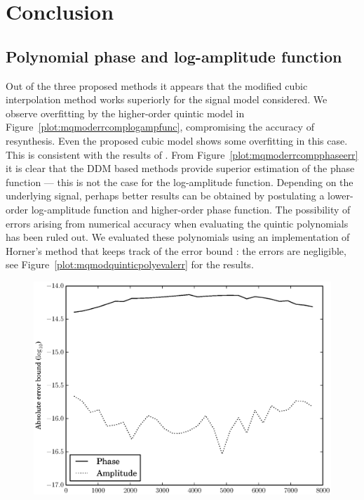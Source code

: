 \section{Conclusion}

\subsection{Polynomial phase and log-amplitude function}

Out of the three proposed methods it appears that the modified cubic
interpolation method works superiorly for the signal model considered. We observe
overfitting by the higher-order quintic model in
Figure~\ref{plot:mqmoderrcomplogampfunc}, compromising the accuracy of
resynthesis.  Even the proposed cubic model shows some overfitting in this case.
This is consistent with the results of \cite{girin2003comparing}. From
Figure~\ref{plot:mqmoderrcompphaseerr} it is clear that the DDM based methods
provide superior estimation of the phase function --- this is not the case for
the log-amplitude function. Depending on the underlying signal, perhaps better
results can be obtained by postulating a lower-order log-amplitude function and
higher-order phase function. The possibility of errors arising from numerical
accuracy when evaluating the quintic polynomials has been ruled out.  We
evaluated these polynomials using an implementation of Horner's method that
keeps track of the error bound \cite[p.~95]{higham2002accuracy}: the errors are
negligible, see Figure~\ref{plot:mqmodquinticpolyevalerr} for the results.

\begin{figure}[!t]
    \centering
    \includegraphics[width=\figwidthscale\textwidth]{plots/mq_mod_quintic_poly_eval_err.eps}
\end{figure}

